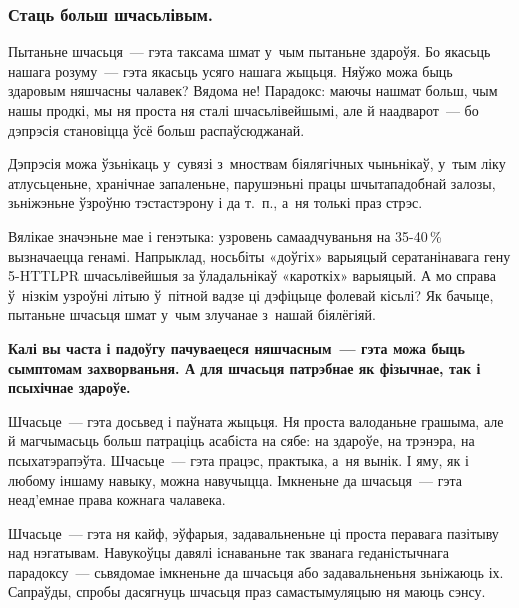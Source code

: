 \subsubsection{Стаць больш шчасьлівым.}

Пытаньне шчасьця~--- гэта таксама шмат у~чым пытаньне здароўя. Бо якасьць нашага розуму~--- гэта якасьць усяго нашага жыцьця. Няўжо можа быць здаровым няшчасны чалавек? Вядома не! Парадокс: маючы нашмат больш, чым нашы продкі, мы ня проста ня сталі шчасьлівейшымі, але й наадварот~--- бо дэпрэсія становіцца ўсё больш распаўсюджанай.

Дэпрэсія можа ўзьнікаць у~сувязі з~мноствам біялягічных чыньнікаў, у~тым ліку атлусьценьне, хранічнае запаленьне, парушэньні працы шчытападобнай залозы, зьніжэньне ўзроўню тэстастэрону і да т.~п., а~ня толькі праз стрэс.

Вялікае значэньне мае і генэтыка: узровень самаадчуваньня на 35-40\,\% вызначаецца генамі. Напрыклад, носьбіты «доўгіх» варыяцый сератанінавага гену 5-HTTLPR шчасьлівейшыя за ўладальнікаў «кароткіх» варыяцый. А мо справа ў~нізкім узроўні літыю ў~пітной вадзе ці дэфіцыце фолевай кісьлі? Як бачыце, пытаньне шчасьця шмат у~чым злучанае з~нашай біялёгіяй.

\textbf{Калі вы часта і падоўгу пачуваецеся няшчасным~--- гэта можа быць сымптомам захворваньня. А для шчасьця патрэбнае як фізычнае, так і псыхічнае здароўе.}

Шчасьце~--- гэта досьвед і паўната жыцьця. Ня проста валоданьне грашыма, але й магчымасьць больш патраціць асабіста на сябе: на здароўе, на трэнэра, на псыхатэрапэўта. Шчасьце~--- гэта працэс, практыка, а~ня вынік. І яму, як і любому іншаму навыку, можна навучыцца. Імкненьне да шчасьця~--- гэта неад'емнае права кожнага чалавека.


Шчасьце~--- гэта ня кайф, эўфарыя, задавальненьне ці проста перавага пазітыву над нэгатывам. Навукоўцы давялі існаваньне так званага геданістычнага парадоксу~--- сьвядомае імкненьне да шчасьця або задавальненьня зьніжаюць іх. Сапраўды, спробы дасягнуць шчасьця праз самастымуляцыю ня маюць сэнсу.


